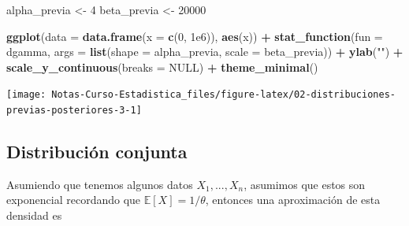 \documentclass[
  12pt,
]{book}
\newenvironment{Shaded}{\begin{snugshade}}{\end{snugshade}}
\newcommand{\DataTypeTok}[1]{\textcolor[rgb]{0.13,0.29,0.53}{#1}}
\newcommand{\DecValTok}[1]{\textcolor[rgb]{0.00,0.00,0.81}{#1}}
\newcommand{\FloatTok}[1]{\textcolor[rgb]{0.00,0.00,0.81}{#1}}
\newcommand{\KeywordTok}[1]{\textcolor[rgb]{0.13,0.29,0.53}{\textbf{#1}}}
\newcommand{\NormalTok}[1]{#1}
\newcommand{\OperatorTok}[1]{\textcolor[rgb]{0.81,0.36,0.00}{\textbf{#1}}}
\newcommand{\OtherTok}[1]{\textcolor[rgb]{0.56,0.35,0.01}{#1}}
\newcommand{\StringTok}[1]{\textcolor[rgb]{0.31,0.60,0.02}{#1}}
\begin{document}
\begin{Shaded}
\begin{Highlighting}[]
\NormalTok{alpha\_previa \textless{}{-}}\StringTok{ }\DecValTok{4}
\NormalTok{beta\_previa \textless{}{-}}\StringTok{ }\DecValTok{20000}

\KeywordTok{ggplot}\NormalTok{(}\DataTypeTok{data =} \KeywordTok{data.frame}\NormalTok{(}\DataTypeTok{x =} \KeywordTok{c}\NormalTok{(}\DecValTok{0}\NormalTok{, }\FloatTok{1e6}\NormalTok{)), }\KeywordTok{aes}\NormalTok{(x)) }\OperatorTok{+}
\StringTok{  }\KeywordTok{stat\_function}\NormalTok{(}\DataTypeTok{fun =}\NormalTok{ dgamma, }\DataTypeTok{args =} \KeywordTok{list}\NormalTok{(}\DataTypeTok{shape =}\NormalTok{ alpha\_previa, }\DataTypeTok{scale =}\NormalTok{ beta\_previa)) }\OperatorTok{+}
\StringTok{  }\KeywordTok{ylab}\NormalTok{(}\StringTok{""}\NormalTok{) }\OperatorTok{+}
\StringTok{  }\KeywordTok{scale\_y\_continuous}\NormalTok{(}\DataTypeTok{breaks =} \OtherTok{NULL}\NormalTok{) }\OperatorTok{+}
\StringTok{  }\KeywordTok{theme\_minimal}\NormalTok{()}
\end{Highlighting}
\end{Shaded}

\begin{center}\texttt{[image: Notas-Curso-Estadistica\_files/figure-latex/02-distribuciones-previas-posteriores-3-1]} \end{center}

\hypertarget{distribuciuxf3n-conjunta}{%
\subsection{Distribución conjunta}\label{distribuciuxf3n-conjunta}}

Asumiendo que tenemos algunos datos \(X_1, ..., X_n\), asumimos que estos son exponencial recordando que \(\mathbb E [X] = 1/\theta\), entonces una aproximación de esta densidad es
\end{document}
